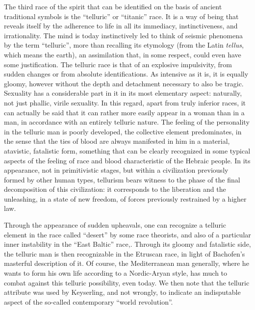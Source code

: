 The third race of the spirit that can be identified on the basis of ancient traditional symbols is the ``telluric'' or ``titanic'' race. It is a way of being that reveals itself by the adherence to life in all its immediacy, instinctiveness, and irrationality. The mind is today instinctively led to think of seismic phenomena by the term ``telluric'', more than recalling its etymology (from the Latin
\emph{tellus}, which means the earth), an assimilation that, in some respect, could even have some justification. The telluric race is that of an explosive impulsivity, from sudden changes or from absolute identifications. As intensive as it is, it is equally gloomy, however without the depth and detachment necessary to also be tragic. Sexuality has a considerable part in it in its most elementary aspect: naturally, not just phallic, virile sexuality. In this regard, apart from truly inferior races, it can actually be said that it can rather more easily appear in a woman than in a man, in accordance with an entirely telluric nature. The feeling of the personality in the telluric man is poorly developed, the collective element predominates, in the sense that the ties of blood are always manifested in him in a material, atavistic, fatalistic form, something that can be clearly recognized in some typical aspects of the feeling of race and blood characteristic of the Hebraic people. In its appearance, not in primitivistic stages, but within a civilization previously formed by other human types, tellurism bears witness to the phase of the final decomposition of this civilization: it corresponds to the liberation and the unleashing, in a state of new freedom, of forces previously restrained by a higher law.

Through the appearance of sudden upheavals, one can recognize a telluric element in the race called ``desert'' by some race theorists, and also of a particular inner instability in the ``East Baltic'' race,. Through its gloomy and fatalistic side, the telluric man is then recognizable in the Etruscan race, in light of Bachofen's masterful description of it. Of course, the Mediterranean man generally, where he wants to form his own life according to a Nordic-Aryan style, has much to combat against this telluric possibility, even today. We then note that the telluric attribute was used by Keyserling, and not wrongly, to indicate an indisputable aspect of the so-called contemporary ``world revolution''.

